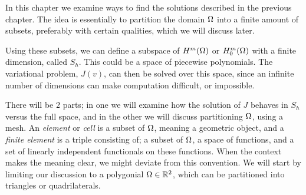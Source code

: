 In this chapter %
we examine ways to find the solutions described in the previous chapter.
The idea is essentially to partition the domain $\Omega$ into a finite amount 
of subsets, preferably with certain qualities, which we will discuss later. 

Using these subsets, we can define a subspace of $H^m(\Omega)$ or $H^m_0(\Omega)$ 
with a finite dimension, called $S_h$. 
This could be a space of piecewise polynomials. 
The variational problem, $J(v)$, can then be 
solved over this space, since an infinite number of dimensions can make 
computation difficult, or impossible.

There will be $2$ parts; in one we 
will examine how the solution of $J$ behaves in $S_h$ versus the full space, 
and in the other we will discuss partitioning $\Omega$, using a mesh.
An \emph{element} or \emph{cell} is a 
subset of $\Omega$, meaning a geometric object, 
and a \emph{finite element} is a 
triple consisting of; a subset of $\Omega$, a space of functions, and a set of 
linearly independent functionals on these functions.
When the context makes the meaning clear, we might deviate from 
this convention.
We will start by limiting our discussion to a polygonial $\Omega \in \mathbb{R}^2$, which 
can be partitioned into triangles or quadrilaterals.